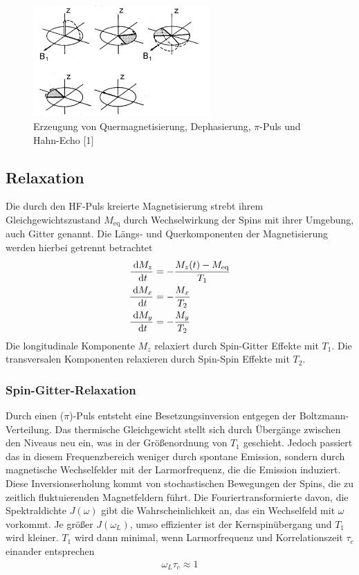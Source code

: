 \begin{figure}[t]
 \includegraphics[width=0.6\textwidth]{../pics/rephasierung.jpg}
 \caption{Erzeugung von Quermagnetisierung, Dephasierung, $\pi$-Puls und Hahn-Echo [1]}
 \label{pic_rephasierung}
\end{figure}

\subsection{Relaxation}
Die durch den HF-Puls kreierte Magnetisierung strebt ihrem Gleichgewichtszustand $M_\text{eq}$ durch Wechselwirkung der Spins mit ihrer Umgebung, auch
Gitter genannt. Die Längs- und Querkomponenten der Magnetisierung werden hierbei getrennt betrachtet
\begin{align}
 \frac{\; \mathrm{d} M_z}{\; \mathrm{d} t} &= -\frac{M_z(t) - M_\text{eq}}{T_1}\\
 \frac{\; \mathrm{d} M_x}{\; \mathrm{d} t} &= -\frac{M_x}{T_2}\\
 \frac{\; \mathrm{d} M_y}{\; \mathrm{d} t} &= -\frac{M_y}{T_2}
\end{align}
\noindent
Die longitudinale Komponente $M_z$ relaxiert durch Spin-Gitter Effekte mit $T_1$. Die transversalen Komponenten relaxieren durch Spin-Spin Effekte mit
$T_2$.

\subsubsection{Spin-Gitter-Relaxation}
Durch einen ($\pi$)-Puls entsteht eine Besetzungsinversion entgegen der Boltzmann-Verteilung. Das thermische Gleichgewicht stellt sich durch Übergänge zwischen
den Niveaus neu ein, was in der Größenordnung von $T_1$ geschieht. Jedoch passiert das in diesem Frequenzbereich weniger durch spontane Emission, sondern durch 
magnetische Wechselfelder mit der Larmorfrequenz, die die Emission induziert. Diese Inversionserholung kommt von stochastischen Bewegungen
der Spins, die zu zeitlich fluktuierenden Magnetfeldern führt. Die Fouriertransformierte davon, die Spektraldichte $J(\omega)$ gibt die Wahrscheinlichkeit an,
das ein Wechselfeld mit $\omega$ vorkommt. Je größer $J(\omega_L)$, umso effizienter ist der Kernspinübergang und $T_1$ wird kleiner. $T_1$ wird dann minimal, 
wenn Larmorfrequenz und Korrelationszeit $\tau_c$ einander entsprechen
\begin{align}
\omega_L \tau_c \approx 1
\label{eq:min}
\end{align}

